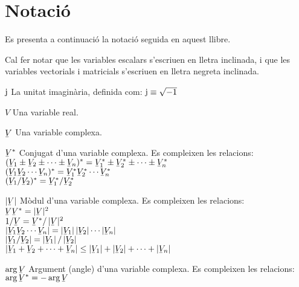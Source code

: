 \chapter*{Notació} 

Es presenta a continuació la notació seguida en aquest llibre.

Cal fer notar que les variables escalars
s'escriuen en lletra  inclinada, i que les variables vectorials i matricials s'escriuen
en lletra negreta inclinada.

\begin{list}{}
{\setlength{\labelwidth}{15mm} \setlength{\leftmargin}{20mm}
\setlength{\labelsep}{5mm}}
    \item[$\mathrm{j}$] La unitat imaginària, definida com:
    $\mathrm{j}\equiv\sqrt{-1}$
    \item[$V$] Una variable real.
    \item[$\cmplx{V}$] Una variable complexa.
    \item[$\cmplx{V}^*$] Conjugat d'una variable complexa.
    Es compleixen les relacions:\\[1ex]
     $(\cmplx{V}_1 \pm \cmplx{V}_2 \pm \cdots  \pm \cmplx{V}_n)^* = \cmplx{V}_1^* \pm
    \cmplx{V}_2^*\pm\cdots\pm\cmplx{V}_n^*$\\[1ex]
    $(\cmplx{V}_1 \cmplx{V}_2 \cdots \cmplx{V}_n)^* = \cmplx{V}_1^*  \cmplx{V}_2^*
    \cdots \cmplx{V}_n^*$\\[1ex]
    $(\cmplx{V}_1 / \cmplx{V}_2)^* = \cmplx{V}_1^* / \cmplx{V}_2^*$
    \item[$|\cmplx{V}|$] Mòdul d'una variable complexa.
    Es compleixen les relacions:\\[1ex]
      $\cmplx{V}\cmplx{V}^* = |\cmplx{V}|^2$\\[1ex]
      $1/ \cmplx{V} = \cmplx{V}^* / \,|\cmplx{V}|^2$\\[1ex]
      $|\cmplx{V}_1 \cmplx{V}_2 \cdots \cmplx{V}_n| =
       |\cmplx{V}_1| \,|\cmplx{V}_2| \cdots |\cmplx{V}_n|$\\[1ex]
       $|\cmplx{V}_1 / \cmplx{V}_2| = |\cmplx{V}_1| \,/ \,|\cmplx{V}_2|$\\[1ex]
      $|\cmplx{V}_1+\cmplx{V}_2+\cdots+\cmplx{V}_n| \leq
      |\cmplx{V}_1| + |\cmplx{V}_2| + \cdots  +|\cmplx{V}_n|$
    \item[$\arg\cmplx{V}$] Argument (angle) d'una variable complexa.
     Es compleixen les relacions:\\[1ex]
      $\arg\cmplx{V}^* = - \arg\cmplx{V}$\\[1ex]

\end{list}

